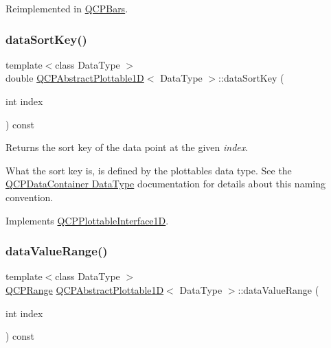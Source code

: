 Reimplemented in \hyperlink{classQCPBars_a55cdaf565cd3384158d1f7f89533bc2d}{Q\+C\+P\+Bars}.

\mbox{\label{classQCPAbstractPlottable1D_aa8277da921b009bce474437d50b4a2d8}} 
\subsubsection{\texorpdfstring{data\+Sort\+Key()}{dataSortKey()}}
{\footnotesize\ttfamily template$<$class Data\+Type $>$ \\
double \hyperlink{classQCPAbstractPlottable1D}{Q\+C\+P\+Abstract\+Plottable1D}$<$ Data\+Type $>$\+::data\+Sort\+Key (\begin{DoxyParamCaption}\item[{int}]{index }\end{DoxyParamCaption}) const\hspace{0.3cm}{\ttfamily [virtual]}}





Returns the sort key of the data point at the given {\itshape index}.

What the sort key is, is defined by the plottable\textquotesingle{}s data type. See the \hyperlink{classQCPDataContainer_qcpdatacontainer-datatype}{Q\+C\+P\+Data\+Container Data\+Type} documentation for details about this naming convention. 

Implements \hyperlink{classQCPPlottableInterface1D_afdc92f9f01e7e35f2e96b2ea9dc14ae7}{Q\+C\+P\+Plottable\+Interface1D}.

\mbox{\label{classQCPAbstractPlottable1D_a55f937ba6a63e56e57f0b1a6e85a333a}} 
\subsubsection{\texorpdfstring{data\+Value\+Range()}{dataValueRange()}}
{\footnotesize\ttfamily template$<$class Data\+Type $>$ \\
\hyperlink{classQCPRange}{Q\+C\+P\+Range} \hyperlink{classQCPAbstractPlottable1D}{Q\+C\+P\+Abstract\+Plottable1D}$<$ Data\+Type $>$\+::data\+Value\+Range (\begin{DoxyParamCaption}\item[{int}]{index }\end{DoxyParamCaption}) const\hspace{0.3cm}{\ttfamily [virtual]}}





